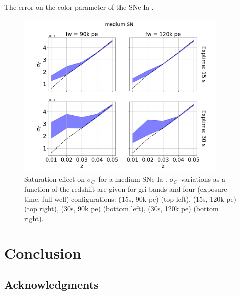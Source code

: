 \documentclass[\docopts]{\docclass}
\newcommand{\sne}{{SNe Ia }}
\newcommand{\pe}{{pe}}
\newcommand{\colorerr}{{$\sigma_C$}}
\begin{document}
The error on the color parameter of the \sne.
\begin{figure}[htbp]
\begin{center}
  \includegraphics[width=0.9\textwidth]{sigmac_medium.png}
 \caption{Saturation effect on \colorerr~for a medium \sne. \colorerr~variations as a function of the redshift are given for gri bands and four (exposure time, full well) configurations: (15s, 90k \pe) (top left),  (15s, 120k \pe) (top right), (30s, 90k \pe) (bottom left),  (30s, 120k \pe) (bottom right).}\label{fig:sigmamedium}
\end{center}
\end{figure}



\section{Conclusion}
\label{sec:conclusion}




\subsection*{Acknowledgments}


\end{document}
